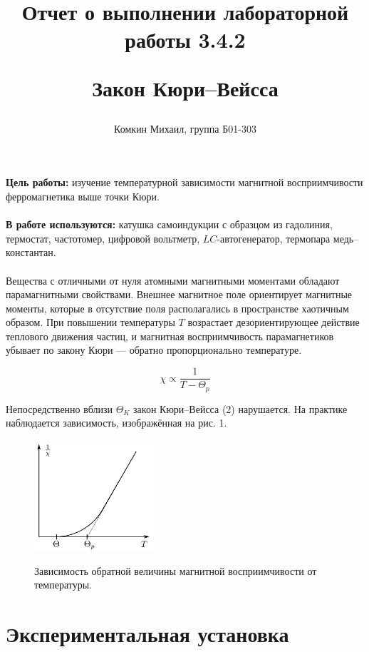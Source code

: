 \documentclass[12pt,a4paper]{article}
\title{
Отчет о выполнении лабораторной работы 3.4.2

Закон Кюри–Вейсса
}
\author{Комкин Михаил, группа Б01-303}
\begin{document}
\maketitle
\textbf{Цель работы:} изучение температурной зависимости магнитной восприимчивости ферромагнетика выше точки Кюри.
\\
\\
\textbf{В работе используются:} катушка самоиндукции с образцом из гадолиния, термостат, частотомер, цифровой вольтметр, $LC$-автогенератор, термопара медь–константан.
\\
\\
Вещества с отличными от нуля атомными магнитными моментами
обладают парамагнитными свойствами. Внешнее магнитное поле ориентирует магнитные моменты, которые в отсутствие поля располагались
в пространстве хаотичным образом. При повышении температуры $T$ возрастает дезориентирующее действие теплового движения частиц, и магнитная восприимчивость парамагнетиков убывает по закону Кюри
— обратно пропорционально температуре. 

\[
\chi \propto \frac{1}{T - \Theta_p}
\]

Непосредственно вблизи $\Theta_K$ закон Кюри–Вейсса (2) нарушается. На
практике наблюдается зависимость, изображённая на рис. 1.

\begin{figure}[h!]
	\begin{center}
		\includegraphics[width = 0.4\textwidth]{image.png}
		\label{fig:facility}
        \caption{Зависимость обратной
        величины магнитной восприимчивости от температуры.}
	\end{center}
\end{figure}

\section{Экспериментальная установка}
\end{document}
